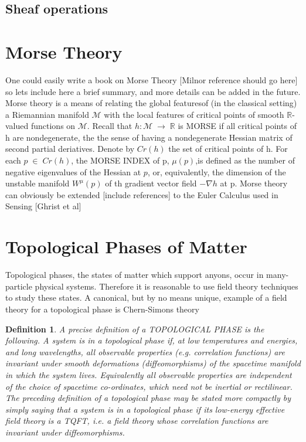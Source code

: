\documentclass[preprint, 5p, 10pt]{elsarticle}
\theoremstyle{plain}
\newtheorem{definition}[theorem]{Definition}
\begin{document}
\subsection{Sheaf operations}
\section{Morse Theory}
One could easily write a book on Morse Theory [Milnor reference should go here] so lets include here a brief summary, and more details can 
be added in the future. Morse theory is a means of relating the global featuresof (in the classical setting) a Riemannian manifold 
$\mathcal{M}$ with the local features of critical points of smooth $\mathbb{R}$-valued functions on $\mathcal{M}$. 
Recall that $h:\mathcal{M}\;\rightarrow\;
\mathbb{R}$ is MORSE if all critical points of h are nondegenerate, the the sense of having a nondegenerate Hessian matrix of second partial
deriatives. Denote by $Cr(h)$ the set of critical points of h. For each $p\;\in\;Cr(h)$, the MORSE INDEX of p, $\mu(p)$,is defined as the number
of negative eigenvalues of the Hessian at $p$, or, equivalently, the dimension of the unstable manifold $W^{\mu}(p)$ of th gradient vector field
$-\nabla h$ at p. Morse theory can obviously be extended [include references] to the Euler Calculus used in Sensing [Ghrist et al]
\section{Topological Phases of Matter}
Topological phases, the states of matter which support anyons, occur in many-particle physical systems.
 Therefore it is reasonable to use field
theory techniques to study these states. A canonical, but by no means unique, example of a field theory for a 
topological phase is Chern-Simons
theory
  \begin{definition}
   A precise definition of a TOPOLOGICAL PHASE is the following. A system is in a topological phase if, at low temperatures and energies,
and long wavelengths, all observable properties (e.g. correlation functions) are invariant under smooth deformations (diffeomorphisms) of the spacetime
manifold in which the system lives. Equivalently all observable properties are independent of the choice of spacetime co-ordinates, which need not
be inertial or rectilinear. 
The preceding definition of a topological phase may be stated more compactly by simply saying that a system is in a topological phase if its
low-energy effective field theory is a TQFT, i.e. a field theory whose correlation functions are invariant under diffeomorphisms.
  \end{definition}
\end{document}
